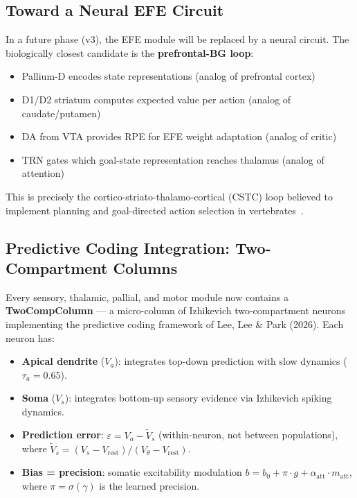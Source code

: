 \documentclass[11pt,a4paper]{article}
\begin{document}
\subsection{Toward a Neural EFE Circuit}

In a future phase (v3), the EFE module will be replaced by a neural circuit.
The biologically closest candidate is the \textbf{prefrontal-BG loop}:
\begin{itemize}[nosep]
  \item Pallium-D encodes state representations (analog of prefrontal cortex)
  \item D1/D2 striatum computes expected value per action (analog of caudate/putamen)
  \item DA from VTA provides RPE for EFE weight adaptation (analog of critic)
  \item TRN gates which goal-state representation reaches thalamus (analog of attention)
\end{itemize}
This is precisely the cortico-striato-thalamo-cortical (CSTC) loop
believed to implement planning and goal-directed action selection
in vertebrates~\cite{redgrave1999}.

\subsection{Predictive Coding Integration: Two-Compartment Columns}

Every sensory, thalamic, pallial, and motor module now contains a
\textbf{TwoCompColumn} --- a micro-column of Izhikevich two-compartment
neurons implementing the predictive coding framework of
Lee, Lee \& Park (2026).  Each neuron has:
\begin{itemize}[nosep]
  \item \textbf{Apical dendrite} ($V_a$): integrates top-down prediction
        with slow dynamics ($\tau_a = 0.65$).
  \item \textbf{Soma} ($V_s$): integrates bottom-up sensory evidence
        via Izhikevich spiking dynamics.
  \item \textbf{Prediction error}: $\varepsilon = V_a - \tilde{V}_s$
        (within-neuron, not between populations), where
        $\tilde{V}_s = (V_s - V_\text{rest})/(V_\theta - V_\text{rest})$.
  \item \textbf{Bias = precision}: somatic excitability modulation
        $b = b_0 + \pi \cdot g + \alpha_\text{att} \cdot m_\text{att}$,
        where $\pi = \sigma(\gamma)$ is the learned precision.
\end{itemize}
\end{document}
